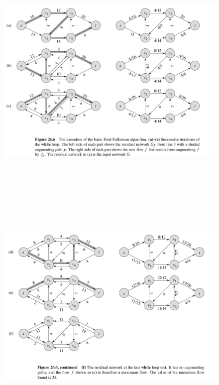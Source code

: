 \documentclass[12pt]{report}
\begin{document}
\begin{figure}[H]
	\begin{Center}
		\includegraphics[width=6.27in,height=4.56in]{./media/image148.png}
	\end{Center}
\end{figure}



\par




\begin{figure}[H]
	\begin{Center}
		\includegraphics[width=6.27in,height=4.47in]{./media/image149.png}
	\end{Center}
\end{figure}
\end{document}
